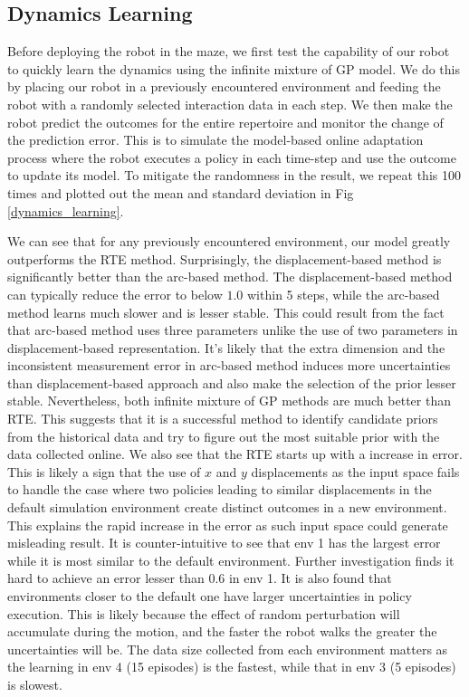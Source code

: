\documentclass[journal]{IEEEtran}
\begin{document}
\subsection{Dynamics Learning}
Before deploying the robot in the maze, we first test the capability of our robot to quickly learn the dynamics using the infinite mixture of GP model.
We do this by placing our robot in a previously encountered environment and feeding the robot with a randomly selected interaction data in each step.
We then make the robot predict the outcomes for the entire repertoire and monitor the change of the prediction error.
This is to simulate the model-based online adaptation process where the robot executes a policy in each time-step and use the outcome to update its model.
To mitigate the randomness in the result, we repeat this 100 times and plotted out the mean and standard deviation in Fig \ref{dynamics_learning}.


We can see that for any previously encountered environment, our model greatly outperforms the RTE method.
Surprisingly, the displacement-based method is significantly better than the arc-based method.
The displacement-based method can typically reduce the error to below $1.0$ within 5 steps, while the arc-based method learns much slower and is lesser stable.
This could result from the fact that arc-based method uses three parameters unlike the use of two parameters in displacement-based representation.
It's likely that the extra dimension and the inconsistent measurement error in arc-based method induces more uncertainties than displacement-based approach and also make the selection of the prior lesser stable.
Nevertheless, both infinite mixture of GP methods are much better than RTE.
This suggests that it is a successful method to identify candidate priors from the historical data and try to figure out the most suitable prior with the data collected online.
We also see that the RTE starts up with a increase in error.
This is likely a sign that the use of $x$ and $y$ displacements as the input space fails to handle the case where two policies leading to similar displacements in the default simulation environment create distinct outcomes in a new environment.
This explains the rapid increase in the error as such input space could generate misleading result.
It is counter-intuitive to see that env 1 has the largest error while it is most similar to the default environment.
Further investigation finds it hard to achieve an error lesser than 0.6 in env 1.
It is also found that environments closer to the default one have larger uncertainties in policy execution.
This is likely because the effect of random perturbation will accumulate during the motion, and the faster the robot walks the greater the uncertainties will be.
The data size collected from each environment matters as the learning in env 4 (15 episodes) is the fastest, while that in env 3 (5 episodes) is slowest.
\end{document}
